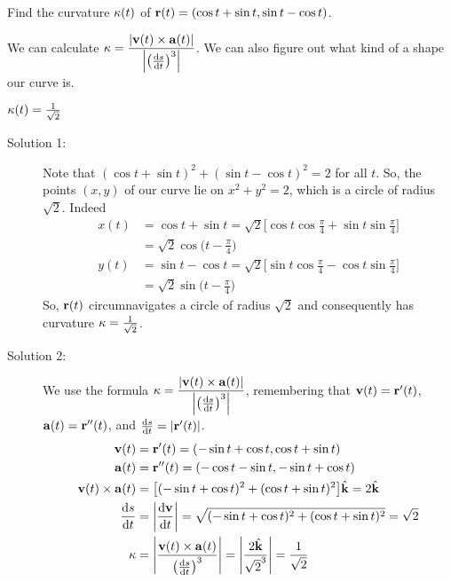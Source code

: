 \begin{question}
Find the curvature $\kappa(t)$ of $\mathbf{r}(t)=(\cos t+\sin t , \sin t - \cos t)$.
\end{question}
\begin{hint}
We can calculate $\ka = \dfrac{|\vv(t) \times \va(t)|}{\left| \left(\diff{s}{t}\right)^3\right|}$. We can also figure out what kind of a shape our curve is.
\end{hint}
\begin{answer}
$\kappa(t)=\frac{1}{\sqrt{2}}$
\end{answer}
\begin{solution}
\begin{description}
\item[Solution 1:] Note that $(\cos t+\sin t )^2+(\sin t - \cos t)^2=2$ for all $t$. So, the points $(x,y)$ of our curve lie on $x^2+y^2=2$, which is a circle of radius $\sqrt{2}$. Indeed
\begin{align*}
x(t)&= \cos t+\sin t 
=\sqrt{2}\big[\cos t \cos\tfrac{\pi}{4} +\sin t \sin\tfrac{\pi}{4}\big]
\\
&=\sqrt{2}\cos\big(t-\tfrac{\pi}{4}\big)
\\
y(t)&= \sin t-\cos t 
=\sqrt{2}\big[\sin t \cos\tfrac{\pi}{4}-\cos t\sin \tfrac{\pi}{4}\big]
\\
&=\sqrt{2}\sin\big(t-\tfrac{\pi}{4}\big)
\end{align*}
So, $\mathbf{r}(t)$ circumnavigates a circle of radius $\sqrt{2}$ and consequently has curvature $\kappa=\frac{1}{\sqrt{2}}$.
\item[Solution 2:]
We use the formula $\ka = \dfrac{|\vv(t) \times \va(t)|}{\left| \left(\diff{s}{t}\right)^3\right|}$, remembering that $\mathbf{v}(t)=\mathbf{r}'(t)$, $\mathbf{a}(t)=\mathbf{r}''(t)$, and $\diff{s}{t}=\left| \vr'(t)\right|$.
\begin{align*}
\vv(t)&=\vr'(t)=(-\sin t +\cos t, \cos t + \sin t)\\
\va(t)&=\vr''(t)=(-\cos t  -\sin t, -\sin t + \cos t)\\
\vv(t) \times \va(t)&=\big[(-\sin t + \cos t)^2+(\cos t + \sin t)^2\big]\hk=2\hk\\
\diff{s}{t}&=\left|\diff{\vv}{t} \right|=\sqrt{(-\sin t + \cos t)^2+(\cos t + \sin t )^2}=\sqrt2\\
\ka&=\left|\frac{\vv(t) \times \va(t)}{\left(\diff{s}{t}\right)^3}\right|=\left|\frac{2\hk}{\sqrt{2}^3}\right|=\frac{1}{\sqrt 2}
\end{align*}
\end{description}
\end{solution}

